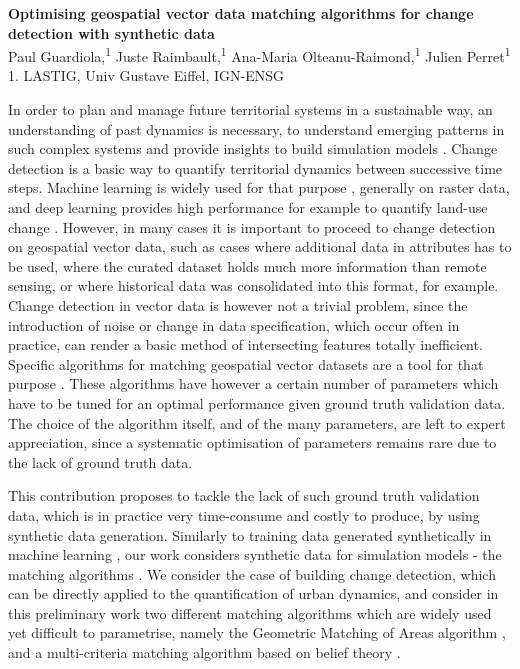 \documentclass[11pt]{article}
\renewcommand{\title}[1]{{\noindent\large\bfseries#1\medskip\\}}
\renewcommand{\author}[2]{{\noindent #1 \medskip\\ \small #2 \medskip\\}}
\begin{document}
\title{Optimising geospatial vector data matching algorithms for change detection with synthetic data}
\author{
Paul Guardiola,\textsuperscript{1}
Juste Raimbault,\textsuperscript{1}
Ana-Maria Olteanu-Raimond,\textsuperscript{1}
Julien Perret\textsuperscript{1}
}
{
1. LASTIG, Univ Gustave Eiffel, IGN-ENSG
}


In order to plan and manage future territorial systems in a sustainable way, an understanding of past dynamics is necessary, to understand emerging patterns in such complex systems and provide insights to build simulation models \cite{rozenblat2018conclusion}. Change detection is a basic way to quantify territorial dynamics between successive time steps. Machine learning is widely used for that purpose \cite{wang2022machine}, generally on raster data, and deep learning provides high performance for example to quantify land-use change \cite{khelifi2020deep}. However, in many cases it is important to proceed to change detection on geospatial vector data, such as cases where additional data in attributes has to be used, where the curated dataset holds much more information than remote sensing, or where historical data was consolidated into this format, for example. Change detection in vector data is however not a trivial problem, since the introduction of noise or change in data specification, which occur often in practice, can render a basic method of intersecting features totally inefficient. Specific algorithms for matching geospatial vector datasets are a tool for that purpose \cite{xavier2016survey}. These algorithms have however a certain number of parameters which have to be tuned for an optimal performance given ground truth validation data. The choice of the algorithm itself, and of the many parameters, are left to expert appreciation, since a systematic optimisation of parameters remains rare due to the lack of ground truth data.

This contribution proposes to tackle the lack of such ground truth validation data, which is in practice very time-consume and costly to produce, by using synthetic data generation. Similarly to training data generated synthetically in machine learning \cite{nikolenko2021synthetic}, our work considers synthetic data for simulation models - the matching algorithms \cite{raimbault2019second}. We consider the case of building change detection, which can be directly applied to the quantification of urban dynamics, and consider in this preliminary work two different matching algorithms which are widely used yet difficult to parametrise, namely the Geometric Matching of Areas algorithm \cite{harvey1998geometric}, and a multi-criteria matching algorithm based on belief theory \cite{olteanu2008data}.
\end{document}
